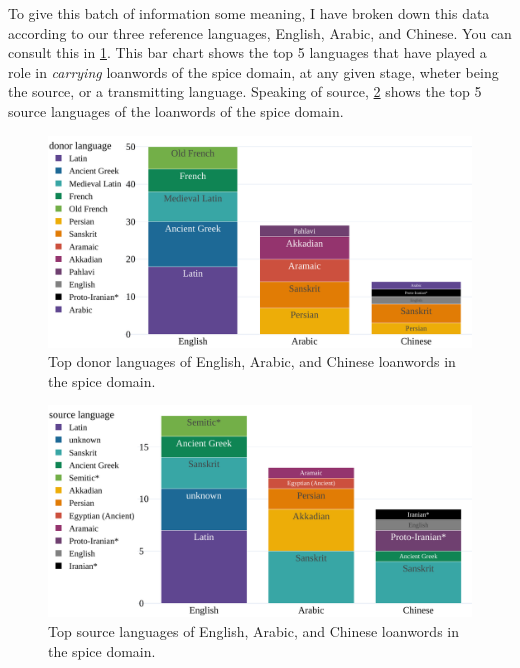 
To give this batch of information some meaning, I have broken down this data according to our three reference languages, English, Arabic, and Chinese. You can consult this in \cref{fig:donor_bar}. This bar chart shows the top 5 languages that have played a role in \textit{carrying} loanwords of the spice domain, at any given stage, wheter being the source, or a transmitting language. Speaking of source, \cref{fig:source_bar} shows the top 5 source languages of the loanwords of the spice domain.

\begin{figure}[!ht]
  \centering
  \includegraphics[width=\linewidth]{imgs/plots/donor_bar.pdf}
  \caption{Top donor languages of English, Arabic, and Chinese loanwords in the spice domain.}
  \label{fig:donor_bar}
\end{figure}

\begin{figure}[!ht]
  \centering
  \includegraphics[width=\linewidth]{imgs/plots/source_bar.pdf}
  \caption{Top source languages of English, Arabic, and Chinese loanwords in the spice domain.}
  \label{fig:source_bar}
\end{figure}




